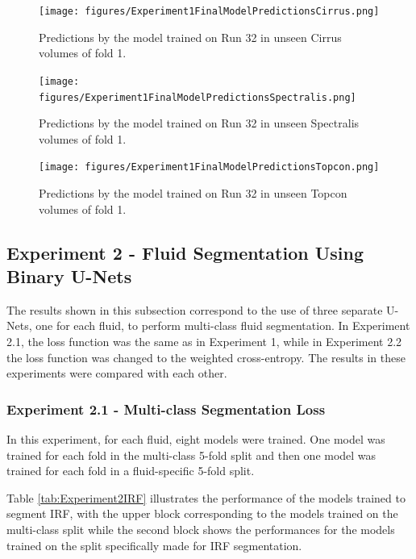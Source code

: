 \begin{figure}[!ht]
	\centering
	\texttt{[image: figures/Experiment1FinalModelPredictionsCirrus.png]}
	\caption{Predictions by the model trained on Run 32 in unseen Cirrus volumes of fold 1.}
	\label{fig:Experiment1FinalModelPredictionsCirrus}
\end{figure}

\begin{figure}[!ht]
	\centering
	\texttt{[image: figures/Experiment1FinalModelPredictionsSpectralis.png]}
	\caption{Predictions by the model trained on Run 32 in unseen Spectralis volumes of fold 1.}
	\label{fig:Experiment1FinalModelPredictionsSpectralis}
\end{figure}

\begin{figure}[!ht]
	\centering
	\texttt{[image: figures/Experiment1FinalModelPredictionsTopcon.png]}
	\caption{Predictions by the model trained on Run 32 in unseen Topcon volumes of fold 1.}
	\label{fig:Experiment1FinalModelPredictionsTopcon}
\end{figure}

\subsection{Experiment 2 - Fluid Segmentation Using Binary U-Nets}
The results shown in this subsection correspond to the use of three separate U-Nets, one for each fluid, to perform multi-class fluid segmentation. In Experiment 2.1, the loss function was the same as in Experiment 1, while in Experiment 2.2 the loss function was changed to the weighted cross-entropy. The results in these experiments were compared with each other.

\subsubsection{Experiment 2.1 - Multi-class Segmentation Loss}
In this experiment, for each fluid, eight models were trained. One model was trained for each fold in the multi-class 5-fold split and then one model was trained for each fold in a fluid-specific 5-fold split.
\par
Table \ref{tab:Experiment2IRF} illustrates the performance of the models trained to segment IRF, with the upper block corresponding to the models trained on the multi-class split while the second block shows the performances for the models trained on the split specifically made for IRF segmentation.

